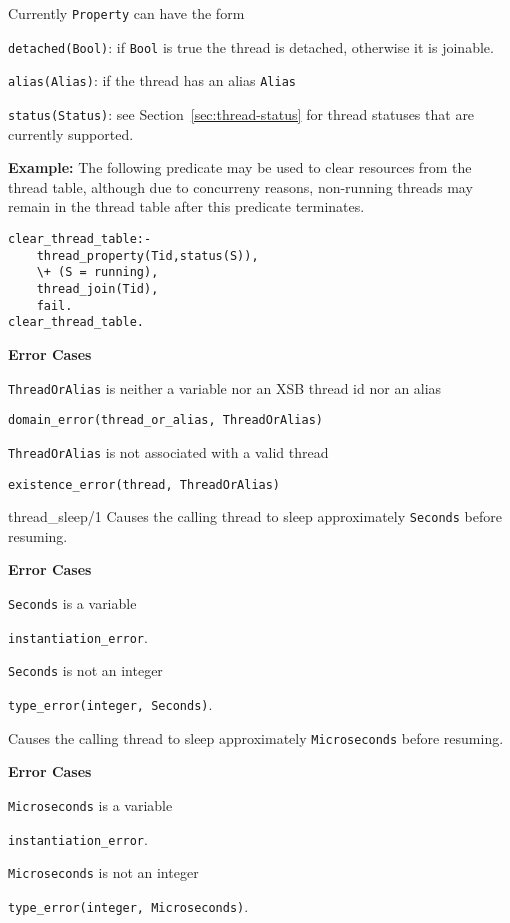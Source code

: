 \begin{description}
Currently {\tt Property} can have the form 
\bi
\item {\tt detached(Bool)}: if {\tt Bool} is true the thread is
  detached, otherwise it is joinable.
%
\item {\tt alias(Alias)}: if the thread has an alias {\tt Alias}
%
\item {\tt status(Status)}: see Section~\ref{sec:thread-status} for
  thread statuses that are currently supported.
\ei

{\bf Example:} The following predicate may be used to clear resources
from the thread table, although due to concurreny reasons, non-running
threads may remain in the thread table after this predicate
terminates.
\begin{verbatim}
clear_thread_table:- 
    thread_property(Tid,status(S)),
    \+ (S = running),
    thread_join(Tid),
    fail.
clear_thread_table.
\end{verbatim}

{\bf Error Cases}
%
\bi
\item {\tt ThreadOrAlias} is neither a variable nor an XSB thread id
  nor an alias
\bi
\item {\tt domain\_error(thread\_or\_alias, ThreadOrAlias)}
\ei
\item {\tt ThreadOrAlias} is not associated with a valid thread
\bi
\item {\tt existence\_error(thread, ThreadOrAlias)}
\ei
\ei

{thread\_sleep/1}
%
Causes the calling thread to sleep approximately {\tt Seconds}
before resuming.

{\bf Error Cases}
\bi
\item 	{\tt Seconds} is a variable
\bi
\item 	{\tt instantiation\_error}.
\ei
\item 	{\tt Seconds} is not an integer
\bi
\item 	{\tt type\_error(integer, Seconds)}.
\ei
\ei



%
Causes the calling thread to sleep approximately {\tt Microseconds}
before resuming.

{\bf Error Cases}
\bi
\item 	{\tt Microseconds} is a variable
\bi
\item 	{\tt instantiation\_error}.
\ei
\item 	{\tt Microseconds} is not an integer
\bi
\item 	{\tt type\_error(integer, Microseconds)}.
\ei
\ei
% 
\end{description}

